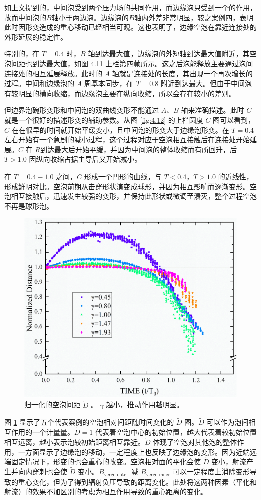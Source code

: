 如上文提到的，中间泡受到两个压力场的共同作用，而边缘泡只受到一个的作用，故而中间泡的$B$轴小于两边泡。边缘泡的$B$轴内外差非常明显，较之案例四，表明此时因形变造成的重心移动已经相当可观。这也表明了，边缘空泡在靠近连接处的外形延展的稳定性。

特别的，在 $T=0.4$ 时，$B$
轴到达最大值，边缘泡的外短轴到达最大值附近，其空泡间距也到达最大值，如图
4.11
上栏第四帧所示。这之后泡能释放主要通过泡间连接处的相互延展释放。此时的
$A$ 轴就是连接处的长度，其出现一个再次增长的过程。中间和边缘泡的 $A$
周基本同步，在 $T=0.8$
附近到达最大。但由于中间泡有较明显的横向收缩，而边缘泡主要在纵向收缩，所以会存在较小的差别。

但边界泡碗形变形和中间泡的双曲线变形不能通过 $A$、$B$
轴来准确描述。此时 $C$ 就是一个很好的描述形变的辅助参数。从图 \ref{fig:4.12}
的上栏圆度 $C$ 图可以看到，$C$
在在很早的时间就开始平缓变小，且中间泡的形变大于边缘泡形变。在
$T=0.4$左右开始有一个急剧的减小过程，这个过程对应于空泡相互接触后在连接处开始延展。$C$
在 $R$到达最大后开始平缓，并因为中间泡的整体收缩而有所回升，后
$T>1.0$ 因纵向收缩占据主导后又开始减小。

在 $T=0.4-1.0$ 之间，$C$ 形成一个凹形的曲线，与 $T<0.4$，$T>1.0$
的近线性，形成鲜明对比。空泡前期从击穿形状演变成球形，并因为相互影响而逐渐变形。空泡相互接触后，迅速发生较强的变形，并保持此形状或微调至溃灭，整个过程空泡不再是球形泡。

\begin{figure}[H]
    \centering
    \includegraphics[width=0.8\linewidth]{img/fig4.13.png}
    \caption{归一化的空泡间距 $\tilde{D}$ 。 $\gamma$
越小，推动作用越明显。}
    \label{fig:4.13}
\end{figure}


图 \ref{fig:4.13} 显示了五个代表案例的空泡相对间距随时间变化的 $\tilde{D}$
图。$\tilde{D}$ 可以作为泡间相互作用的一个计量量。$\tilde{D}=1$
代表着空泡中心的初始位置，越大代表着较初始位置相互远离，越小表示泡较初始距离相互靠近。$\tilde{D}$
体现了空泡对其他泡的整体作用，一方面显示了边缘泡的移动，一定程度上也反映了边缘泡的变形。因为近端远端固定情况下，形变的也会重心的改变。空泡相对面的平化会使
$\tilde{D}$ 变小，射流产生并向内穿刺也会使 $\tilde{D}$
变小。$B_\text{verge-outer}$ 减 $B_\text{verge-inner}$
可以一定程度上消除变形导致的重心变化，但为了得到辐射负压导致的距离变化。此处将这两种因素（平化和射流）的效果不加区别的考虑为相互作用导致的重心距离的变化。

